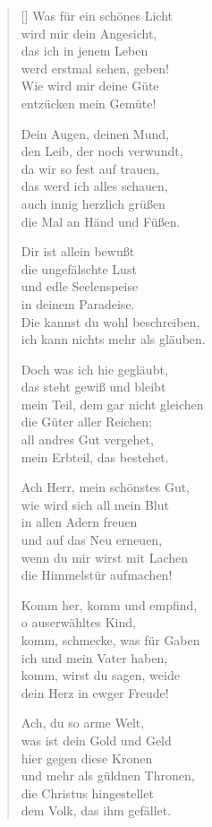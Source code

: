 \begin{multicols}{2}
\begin{verse}[\versewidth]
 Was für ein schönes Licht\\
wird mir dein Angesicht,\\
das ich in jenem Leben\\
werd erstmal sehen, geben!\\
Wie wird mir deine Güte\\
entzücken mein Gemüte!

 Dein Augen, deinen Mund,\\
den Leib, der noch verwundt,\\
da wir so fest auf trauen,\\
das werd ich alles schauen,\\
auch innig herzlich grüßen\\
die Mal an Händ und Füßen.

 Dir ist allein bewußt\\
die ungefälschte Lust\\
und edle Seelenspeise\\
in deinem Paradeise.\\
Die kannst du wohl beschreiben,\\
ich kann nichts mehr als gläuben.

 Doch was ich hie gegläubt,\\
das steht gewiß und bleibt\\
mein Teil, dem gar nicht gleichen\\
die Güter aller Reichen;\\
all andres Gut vergehet,\\
mein Erbteil, das bestehet.

 Ach Herr, mein schönstes Gut,\\
wie wird sich all mein Blut\\
in allen Adern freuen\\
und auf das Neu erneuen,\\
wenn du mir wirst mit Lachen\\
die Himmelstür aufmachen!

 Komm her, komm und empfind,\\
o auserwähltes Kind,\\
komm, schmecke, was für Gaben\\
ich und mein Vater haben,\\
komm, wirst du sagen, weide\\
dein Herz in ewger Freude!

 Ach, du so arme Welt,\\
was ist dein Gold und Geld\\
hier gegen diese Kronen\\
und mehr als güldnen Thronen,\\
die Christus hingestellet\\
dem Volk, das ihm gefället.


\end{verse}
\end{multicols}
